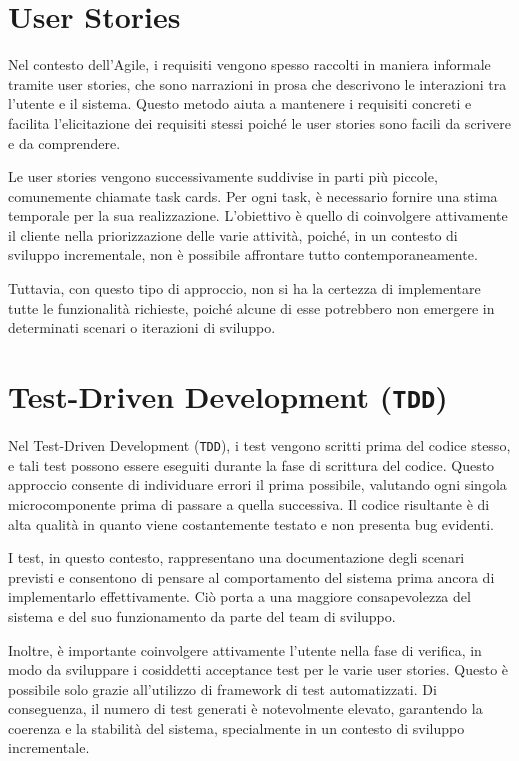 \section{User Stories}
Nel contesto dell'Agile, i requisiti vengono spesso raccolti in maniera informale tramite user stories, che sono narrazioni in prosa
che descrivono le interazioni tra l'utente e il sistema. Questo metodo aiuta a mantenere i requisiti concreti e facilita l'elicitazione
dei requisiti stessi poiché le user stories sono facili da scrivere e da comprendere.

Le user stories vengono successivamente suddivise in parti più piccole, comunemente chiamate task cards. Per ogni task, è necessario
fornire una stima temporale per la sua realizzazione. L'obiettivo è quello di coinvolgere attivamente il cliente nella priorizzazione
delle varie attività, poiché, in un contesto di sviluppo incrementale, non è possibile affrontare tutto contemporaneamente.

Tuttavia, con questo tipo di approccio, non si ha la certezza di implementare tutte le funzionalità richieste, poiché alcune di esse
potrebbero non emergere in determinati scenari o iterazioni di sviluppo.

\section{Test-Driven Development (\texttt{TDD})}
Nel Test-Driven Development (\texttt{TDD}), i test vengono scritti prima del codice stesso, e tali test possono essere eseguiti durante la fase
di scrittura del codice. Questo approccio consente di individuare errori il prima possibile, valutando ogni singola microcomponente
prima di passare a quella successiva. Il codice risultante è di alta qualità in quanto viene costantemente testato e non presenta bug
evidenti.

I test, in questo contesto, rappresentano una documentazione degli scenari previsti e consentono di pensare al comportamento del sistema
prima ancora di implementarlo effettivamente. Ciò porta a una maggiore consapevolezza del sistema e del suo funzionamento da parte del
team di sviluppo.

Inoltre, è importante coinvolgere attivamente l'utente nella fase di verifica, in modo da sviluppare i cosiddetti acceptance test per le
varie user stories. Questo è possibile solo grazie all'utilizzo di framework di test automatizzati. Di conseguenza, il numero di test
generati è notevolmente elevato, garantendo la coerenza e la stabilità del sistema, specialmente in un contesto di sviluppo incrementale.

